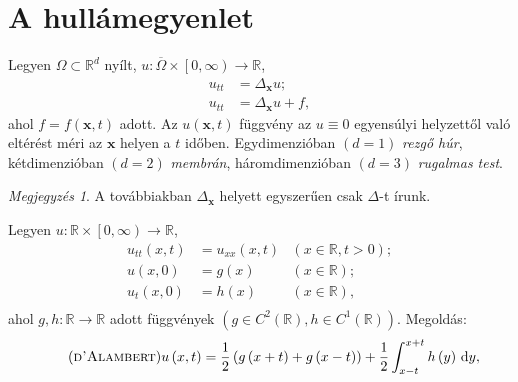 \documentclass[%
	DIV=15,appendixprefix]{scrreprt}
\theoremstyle{definition}
\theoremstyle{remark}
\newtheorem*{megj}{Megjegyzés}
\begin{document}
\section{A hullámegyenlet}
%
Legyen $ \Omega \subset \mathbb{ R }^{ d } $ nyílt, $ u \colon \overline{ \Omega } \times
\left.\left[ 0,{} \infty \right)\right.\rightarrow \mathbb{ R } $,
\begin{align}
	u_{ tt } 	&= \Delta_{ \mathbf{ x } } u;\tag{homogén}\\
	u_{ tt } 	&= \Delta_{ \mathbf{ x } } u + f,\tag{inhomogén}
\end{align}
ahol $ f = f \left( \mathbf{ x },{} t \right) $ adott. Az $ u \left( \mathbf{ x },{} t \right) $
függvény az $ u \equiv 0 $ egyensúlyi helyzettől való eltérést méri az $ \mathbf{ x } $ helyen a
$ t $ időben. Egydimenzióban $ \left( d = 1 \right) $ \emph{rezgő húr}, kétdimenzióban
$ \left( d = 2 \right) $ \emph{membrán}, háromdimenzióban $ \left( d = 3 \right) $ \emph{rugalmas
test}.
\begin{megj}
	A továbbiakban $ \Delta_{ \mathbf{ x } } $ helyett egyszerűen csak $ \Delta $-t írunk.
\end{megj}
%
Legyen $ u \colon \mathbb{ R } \times \left.\left[ 0,{} \infty \right)\right.\rightarrow
\mathbb{ R } $,
\begin{equation*}
	\begin{aligned}
		u_{ tt } \left(x,{} t \right) 	&= u_{ xx } \left( x,{} t \right) 	&
			\left( x \in \mathbb{ R },{} t > 0 \right);\\
		u \left( x,{} 0 \right) 		&= g \left( x \right) 				& \left( x \in
			\mathbb{ R } \right);\\
		u_{ t } \left( x,{} 0 \right) 	&= h \left( x \right) 				& \left( x \in
			\mathbb{ R } \right),\\
	\end{aligned}
\end{equation*}
ahol $ g,{} h \colon \mathbb{ R } \rightarrow \mathbb{ R } $ adott függvények $ \left( g\in C^{ 2 }
\left( \mathbb{ R } \right),{} h \in C^{ 1 } \left( \mathbb{ R } \right) \right) $. Megoldás:
\begin{equation}\tag{\textsc{d'Alambert}}\label{eq:pde-hullam-dalamb}
	u \left( x,{} t \right) = \frac{ 1 }{ 2 } \left( g \left( x + t \right) + g \left( x - t \right)
	\right) + \frac{ 1 }{ 2 } \int_{ x - t }^{ x + t } h \left( y \right) \, \mathrm{ d } y,
\end{equation}
\end{document}

